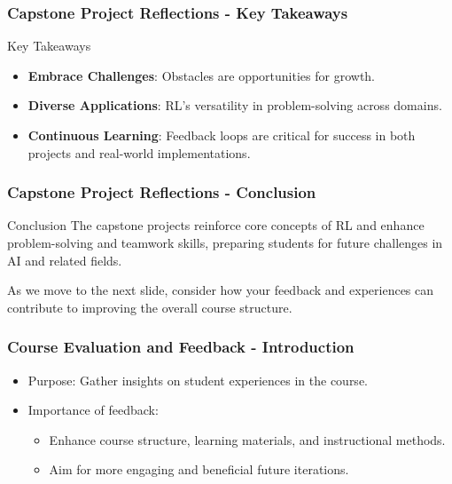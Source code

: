 \documentclass[aspectratio=169]{beamer}
\begin{document}
\begin{frame}[fragile]
    \frametitle{Capstone Project Reflections - Key Takeaways}
    \begin{block}{Key Takeaways}
        \begin{itemize}
            \item \textbf{Embrace Challenges}: Obstacles are opportunities for growth.
            \item \textbf{Diverse Applications}: RL's versatility in problem-solving across domains.
            \item \textbf{Continuous Learning}: Feedback loops are critical for success in both projects and real-world implementations.
        \end{itemize}
    \end{block}
\end{frame}

\begin{frame}[fragile]
    \frametitle{Capstone Project Reflections - Conclusion}
    \begin{block}{Conclusion}
        The capstone projects reinforce core concepts of RL and enhance problem-solving and teamwork skills, preparing students for future challenges in AI and related fields.
        \par As we move to the next slide, consider how your feedback and experiences can contribute to improving the overall course structure.
    \end{block}
\end{frame}

\begin{frame}[fragile]
    \frametitle{Course Evaluation and Feedback - Introduction}
    \begin{itemize}
        \item Purpose: Gather insights on student experiences in the course.
        \item Importance of feedback:
        \begin{itemize}
            \item Enhance course structure, learning materials, and instructional methods.
            \item Aim for more engaging and beneficial future iterations.
        \end{itemize}
    \end{itemize}
\end{frame}
\end{document}
